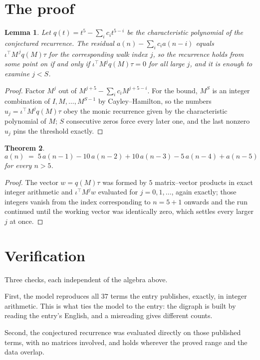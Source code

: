 \documentclass[11pt,a4paper]{article}
\theoremstyle{plain}
\newtheorem{theorem}{Theorem}
\newtheorem{lemma}[theorem]{Lemma}
\theoremstyle{definition}
\begin{document}
\section{The proof}

\begin{lemma}\label{lem:crit}
Let $q(t)=t^{5}-\sum_i c_it^{5-i}$ be the characteristic polynomial of the
conjectured recurrence. The residual $a(n)-\sum_ic_ia(n-i)$ equals
$\iota^{\!\top}M^{\,j}q(M)\tau$ for the corresponding walk index $j$, so the recurrence
holds from some point on if and only if $\iota^{\!\top}M^{j}q(M)\tau=0$ for all large $j$,
and it is enough to examine $j<S$.
\end{lemma}

\begin{proof}
Factor $M^{j}$ out of $M^{j+5}-\sum_ic_iM^{j+5-i}$. For the bound, $M^{S}$
is an integer combination of $I,M,\dots,M^{S-1}$ by Cayley--Hamilton, so the numbers
$u_j=\iota^{\!\top}M^{j}q(M)\tau$ obey the monic recurrence given by the characteristic
polynomial of $M$; $S$ consecutive zeros force every later one, and the last nonzero $u_j$
pins the threshold exactly.
\end{proof}

\begin{theorem}
\[
a(n)\;=\;5\,a(n-1) - 10\,a(n-2) + 10\,a(n-3) - 5\,a(n-4) + a(n-5)
\]
for every $n>5$.
\end{theorem}

\begin{proof}
The vector $w=q(M)\tau$ was formed by $5$ matrix--vector products in exact integer
arithmetic and $\iota^{\!\top}M^{j}w$ evaluated for $j=0,1,\dots$, again exactly; those
integers vanish from the index corresponding to $n=5+1$ onwards and the run continued
until the working vector was identically zero, which settles every larger $j$ at once.
\end{proof}

\section{Verification}

Three checks, each independent of the algebra above.

First, the model reproduces all $37$ terms the entry publishes, exactly, in integer
arithmetic. This is what ties the model to the entry: the digraph is built by reading the
entry's English, and a misreading gives different counts.

Second, the conjectured recurrence was evaluated directly on those published terms, with no
matrices involved, and holds wherever the proved range and the data overlap.
\end{document}
